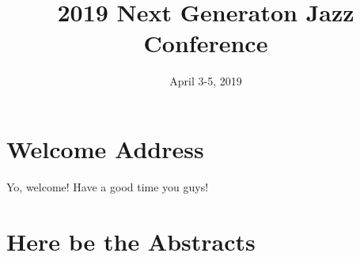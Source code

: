 \documentclass[12pt]{book}
\title{2019 Next Generaton Jazz Conference}
\date{April 3-5, 2019}
\newenvironment{conf-abstract}[4][]{
  \needspace{10\baselineskip}
  \begin{center}
    { \renewcommand\textsuperscript[1]{}
      \phantomsection\addcontentsline{toc}{section}
      {\texorpdfstring{#2 (\emph{#3})}{#2 (#3)}}
    }
    {{\large\bfseries #2}\marginnote{#1}\par}
    \medskip
    {#3\par}
    \smallskip
    {\small #4\par}
  \end{center}
}{%
  \bigskip
  \hrule
  \bigskip
}
\newcommand{\indexauthors}[1]{%
  \forcsvlist{\index}{#1}
}
\begin{document}
\frontmatter

\maketitle

\chapter{Welcome Address}

Yo, welcome! Have a good time you guys!

\tableofcontents

\mainmatter
\chapter{Here be the Abstracts}

%




\backmatter
\renewcommand{\indexname}{Author Index}
\printindex
\end{document}
